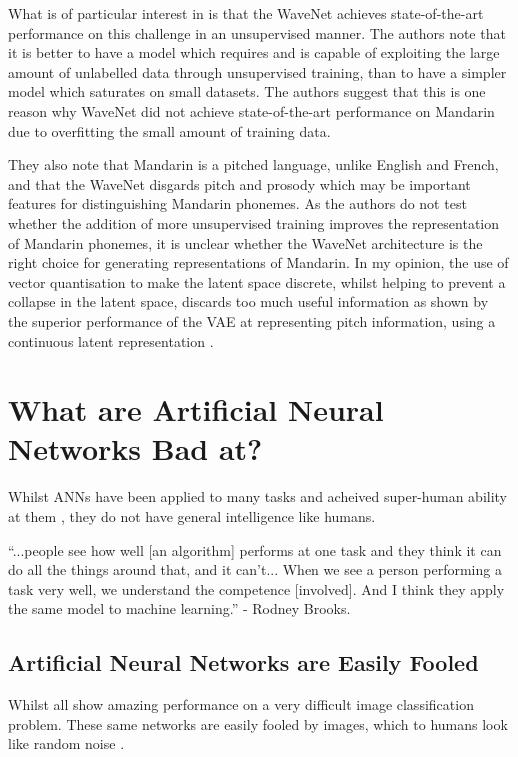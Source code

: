 What is of particular interest in \cite{wavenet} is that the WaveNet achieves state-of-the-art performance on this challenge in an unsupervised manner. The authors note that it is better to have a model which requires and is capable of exploiting the large amount of unlabelled data through unsupervised training, than to have a simpler model which saturates on small datasets. The authors suggest that this is one reason why WaveNet did not achieve state-of-the-art performance on Mandarin due to overfitting the small amount of training data.

They also note that Mandarin is a pitched language, unlike English and French, and that the WaveNet disgards pitch and prosody \cite{van2017neural} which may be important features for distinguishing Mandarin phonemes. As the authors do not test whether the addition of more unsupervised training improves the representation of Mandarin phonemes, it is unclear whether the WaveNet architecture is the right choice for generating representations of Mandarin. In my opinion, the use of vector quantisation to make the latent space discrete, whilst helping to prevent a collapse in the latent space, discards too much useful information as shown by the superior performance of the \ac{VAE} at representing pitch information, using a continuous latent representation \cite{wavenet}. 

\section{What are Artificial Neural Networks Bad at?}
Whilst \acp{ANN} have been applied to many tasks and acheived super-human ability at them \cite{vinyals2019alphastar}, they do not have general intelligence like humans.

\begin{displayquote}
``...people see how well [an algorithm] performs at one task and they think it can do all the things around that, and it can’t... When we see a person performing a task very well, we understand the competence [involved]. And I think they apply the same model to machine learning.'' - Rodney Brooks.
\end{displayquote}

\subsection{Artificial Neural Networks are Easily Fooled}
Whilst \cite{krizhevsky2012imagenet, simonyan2014very, szegedy2015going, szegedy2016rethinking, szegedy2017inception, he2016deep, huang2017densely, russakovsky2015imagenet, chiu2018state, eslami2018neural} all show amazing performance on a very difficult image classification problem. These same networks are easily fooled by images, which to humans look like random noise \cite{nguyen2015deep}.


